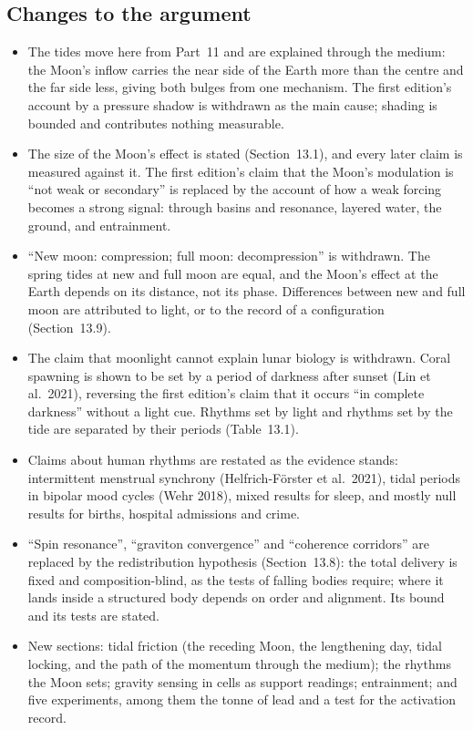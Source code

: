 \documentclass[11pt,a4paper]{article}
\begin{document}
\subsection*{Changes to the argument}
\begin{itemize}
  \item The tides move here from Part~11 and are explained through the medium: the Moon's inflow carries the near side of the Earth more than the centre and the far side less, giving both bulges from one mechanism. The first edition's account by a pressure shadow is withdrawn as the main cause; shading is bounded and contributes nothing measurable.
  \item The size of the Moon's effect is stated (Section~13.1), and every later claim is measured against it. The first edition's claim that the Moon's modulation is ``not weak or secondary'' is replaced by the account of how a weak forcing becomes a strong signal: through basins and resonance, layered water, the ground, and entrainment.
  \item ``New moon: compression; full moon: decompression'' is withdrawn. The spring tides at new and full moon are equal, and the Moon's effect at the Earth depends on its distance, not its phase. Differences between new and full moon are attributed to light, or to the record of a configuration (Section~13.9).
  \item The claim that moonlight cannot explain lunar biology is withdrawn. Coral spawning is shown to be set by a period of darkness after sunset (Lin et al.\ 2021), reversing the first edition's claim that it occurs ``in complete darkness'' without a light cue. Rhythms set by light and rhythms set by the tide are separated by their periods (Table~13.1).
  \item Claims about human rhythms are restated as the evidence stands: intermittent menstrual synchrony (Helfrich-F\"orster et al.\ 2021), tidal periods in bipolar mood cycles (Wehr 2018), mixed results for sleep, and mostly null results for births, hospital admissions and crime.
  \item ``Spin resonance'', ``graviton convergence'' and ``coherence corridors'' are replaced by the redistribution hypothesis (Section~13.8): the total delivery is fixed and composition-blind, as the tests of falling bodies require; where it lands inside a structured body depends on order and alignment. Its bound and its tests are stated.
  \item New sections: tidal friction (the receding Moon, the lengthening day, tidal locking, and the path of the momentum through the medium); the rhythms the Moon sets; gravity sensing in cells as support readings; entrainment; and five experiments, among them the tonne of lead and a test for the activation record.

\end{itemize}
\end{document}
